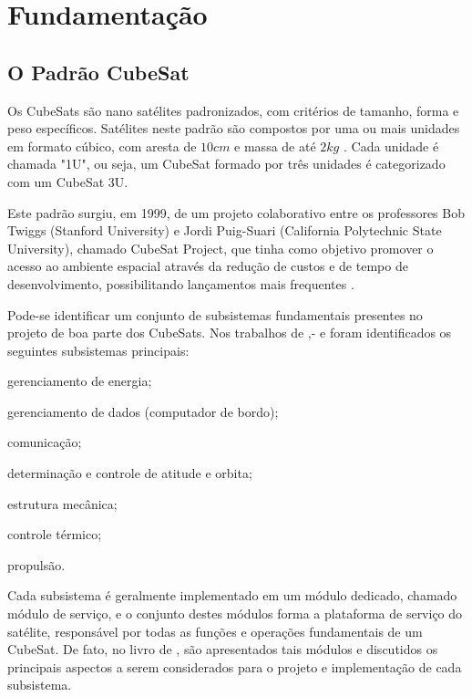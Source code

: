 \chapter{Fundamentação}\label{cap:fundamentacao}

\section{O Padrão CubeSat}\label{sec:cubesats}

Os CubeSats são nano satélites padronizados, com critérios de tamanho, forma e peso específicos.
Satélites neste padrão são compostos por uma ou mais unidades em formato cúbico, com aresta de \(10cm\) e massa de até \(2kg\) \cite{cds}.
Cada unidade é chamada "1U", ou seja, um CubeSat formado por três unidades é categorizado com um CubeSat 3U.

Este padrão surgiu, em 1999, de um projeto colaborativo entre os professores Bob Twiggs (Stanford University) e Jordi Puig-Suari (California Polytechnic State University), chamado CubeSat Project, que tinha como objetivo promover o acesso ao ambiente espacial através da redução de custos e de tempo de desenvolvimento, possibilitando lançamentos mais frequentes \cite{cds}.

Pode-se identificar um conjunto de subsistemas fundamentais presentes no projeto de boa parte dos 
CubeSats. Nos trabalhos de \textcite{tailoring-ecss-nanosat},- \textcite{survey-nanosat-missions-2010} e \textcite{reliability-of-cubesats} foram identificados os seguintes subsistemas principais:
\begin{alineas}
    \item gerenciamento de energia;
    \item gerenciamento de dados (computador de bordo);
    \item comunicação;
    \item determinação e controle de atitude e orbita;
    \item estrutura mecânica;
    \item controle térmico;
    \item propulsão.
\end{alineas}

Cada subsistema é geralmente implementado em um módulo dedicado, chamado módulo de serviço, e o conjunto destes módulos forma a plataforma de serviço do satélite, responsável por todas as funções e operações fundamentais de um CubeSat.
De fato,  no livro de \textcite{cappelletti_2020}, são apresentados tais módulos e discutidos os principais aspectos a serem considerados para o projeto e implementação de cada subsistema.

